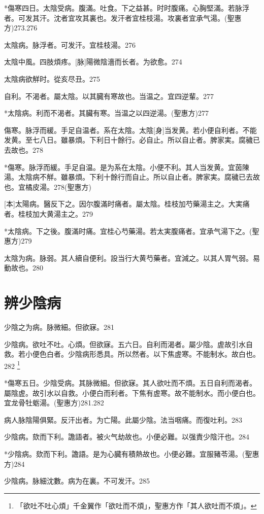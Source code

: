 \documentclass[12pt,twoside,UTF8,b5paper]{ctexbook}
\begin{document}
*傷寒四日。太陰受病。腹滿。吐食。下之益甚。时时腹痛。心胸堅滿。若脉浮者。可发其汗。沈者宜攻其裏也。发汗者宜桂枝湯。攻裏者宜承气湯。(聖惠方)273.276

太陰病。脉浮者。可发汗。宜桂枝湯。276

太陰中風。四肢煩疼。[脉]陽微陰濇而长者。为欲愈。274

太陰病欲觧时。從亥尽丑。275

自利。不渴者。屬太陰。以其臓有寒故也。当温之。宜四逆輩。277

*太陰病。利而不渴者。其臟有寒。当温之以四逆湯。(聖惠方)277

傷寒。脉浮而緩。手足自温者。系在太陰。太陰[身]当发黄。若小便自利者。不能发黄。至七八日。雖暴煩。下利日十餘行。必自止。所以自止者。脾家実。腐穢已去故也。278

*傷寒。脉浮而緩。手足自温。是为系在太陰。小便不利。其人当发黄。宜茵陳湯。太陰病不觧。雖暴煩。下利十餘行而自止。所以自止者。脾家実。腐穢已去故也。宜橘皮湯。278(聖惠方)

[本]太陽病。醫反下之。因尔腹滿时痛者。屬太陰。桂枝加芍藥湯主之。大実痛者。桂枝加大黄湯主之。279

*太陰病。下之後。腹滿时痛。宜桂心芍藥湯。若太実腹痛者。宜承气湯下之。(聖惠方)279

太陰为病。脉弱。其人續自便利。設当行大黄芍藥者。宜減之。以其人胃气弱。易動故也。280

\chapter{辨少陰病}

少陰之为病。脉微細。但欲寐。281

少陰病。欲吐不吐。心煩。但欲寐。五六日。自利而渴者。屬少陰。虗故引水自救。若小便色白者。少陰病形悉具。所以然者。以下焦虗寒。不能制水。故白也。282
	\footnote{「欲吐不吐心煩」千金翼作「欲吐而不煩」，聖惠方作「其人欲吐而不煩」。}

*傷寒五日。少陰受病。其脉微細。但欲寐。其人欲吐而不煩。五日自利而渴者。屬陰虗。故引水以自救。小便白而利者。下焦有虗寒。故不能制水。而小便白也。宜龙骨牡蛎湯。(聖惠方)281.282

病人脉陰陽俱緊。反汗出者。为亡陽。此屬少陰。法当咽痛。而復吐利。283

少陰病。欬而下利。譫語者。被火气劫故也。小便必難。以强責少陰汗也。284

*少陰病。欬而下利。譫語。是为心臓有積熱故也。小便必難。宜服豬苓湯。(聖惠方)284

少陰病。脉細沈數。病为在裏。不可发汗。285
\end{document}
